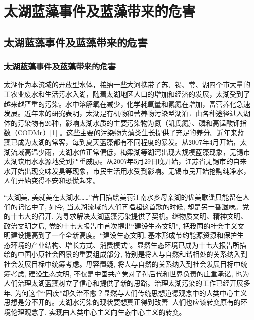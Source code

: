\section{太湖蓝藻事件及蓝藻带来的危害}

\subsection{太湖蓝藻事件及蓝藻带来的危害}

\subsubsection{太湖蓝藻事件及蓝藻带来的危害}

太湖作为本流域的开放型水体，接纳一些大河携带了苏、锡、常、湖四个市大量的工农业废水和生活污水入湖，随着太湖地区人口的增加和经济的发展，太湖受到了越来越严重的污染。水中溶解氧在减少，化学耗氧量和氨氮在增加，富营养化急速发展。近年来的研究表明，太湖是有机物和营养物污染型湖泊，由各种途径进入湖体的污染物有26种，影响太湖水质的主要污染物为氮（凯氏氮）、磷和高锰酸钾指数（CODMn）[1] 。这些主要的污染物为藻类生长提供了充足的养分。近年来蓝藻已成为太湖的常客，每到夏天蓝藻都有不同程度的暴发。从2007年4月开始，太湖流域高温少雨，太湖水位正常偏低，梅梁湖等湖湾出现大规模蓝藻现象，无锡市太湖饮用水水源地受到严重威胁。从2007年5月29日晚开始，江苏省无锡市的自来水开始出现变味发臭等现象，市民生活用水受到影响。无锡市民开始抢购纯净水，人们开始变得不安和恐慌起来。

\newpage

“太湖美, 美就美在太湖水……”昔日描绘美丽江南水乡母亲湖的优美歌谣只能留在人们的记忆中了, 如今, 当太湖流域的人们再唱起这首歌的时候, 却是另一番滋味。党的十七大的召开, 为寻求解决太湖蓝藻污染提供了契机。继物质文明、精神文明、政治文明之后, 党的十七大报告中首次提出“建设生态文明”, 把我国的社会主义文明建设提高到了一个全新高度。“建设生态文明, 基本形成节约能源资源和保护生态环境的产业结构、增长方式、消费模式”。显然生态环境已成为十七大报告所描绘的中国小康社会图景的重要组成部分, 特别是将人与自然和谐相处的关系纳入到社会发展目标中统筹考虑。毋容置疑, 将人与自然的关系纳入到社会发展目标中统筹考虑, 建设生态文明, 不仅是中国共产党对子孙后代和世界负责的庄重承诺, 也为人们治理太湖蓝藻树立了信心和提供了新的思路。治理太湖污染的工作已经开展多年, 为何这个“固疾”却久治不愈？显然与人们传统思想道德观念中的人类中心主义思想是分不开的。太湖水污染的现状要想真正得到改善, 人们也应该转变原有的环境伦理观念了, 实现由人类中心主义向生态中心主义的转变。

